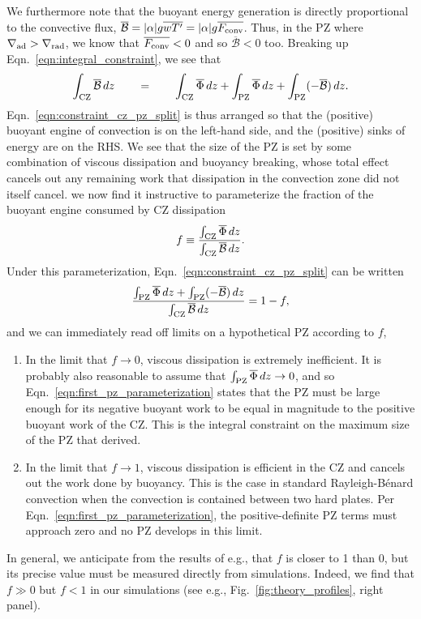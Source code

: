 \documentclass{aastex631}
\newcommand{\gradrad}{\ensuremath{\nabla_{\rm{rad}}}}
\newcommand{\gradad}{\ensuremath{\nabla_{\rm{ad}}}}
\newcommand{\Fconv}{\ensuremath{F_{\rm{conv}}}}
\renewcommand{\bar}[1]{\overline{#1}}
\begin{document}
We furthermore note that the buoyant energy generation is directly proportional to the convective flux, $\bar{\mathcal{B}} = |\alpha|g\bar{w T'} = |\alpha| g \bar{\Fconv}$.
Thus, in the PZ where $\gradad > \gradrad$, we know that $\bar{\Fconv} < 0$ and so $\bar{\mathcal{B}} < 0$ too.
Breaking up Eqn.~\ref{eqn:integral_constraint}, we see that
\begin{equation}
\int_{\rm{CZ}} \bar{\mathcal{B}}\,dz \qquad=\qquad
\int_{\rm{CZ}} \bar{\Phi}\,dz + \int_{\rm{PZ}} \bar{\Phi}\,dz + \int_{\rm{PZ}}(-\bar{\mathcal{B}})\,dz.
\label{eqn:constraint_cz_pz_split}
\end{equation}
Eqn.~\ref{eqn:constraint_cz_pz_split} is thus arranged so that the (positive) buoyant engine of convection is on the left-hand side, and the (positive) sinks of energy are on the RHS.
We see that the size of the PZ is set by some combination of viscous dissipation and buoyancy breaking, whose total effect cancels out any remaining work that dissipation in the convection zone did not itself cancel.
we now find it instructive to parameterize the fraction of the buoyant engine consumed by CZ dissipation  
\begin{equation}
f \equiv \frac{\int_{\rm{CZ}} \bar{\Phi}\,dz}{\int_{\rm{CZ}}\bar{\mathcal{B}}\,dz}.
\label{eqn:f_defn}
\end{equation}
Under this parameterization, Eqn.~\ref{eqn:constraint_cz_pz_split} can be written
\begin{equation}
\frac{\int_{\rm{PZ}} \bar{\Phi}\,dz + \int_{\rm{PZ}}(-\bar{\mathcal{B}})\,dz}{\int_{\rm{CZ}} \bar{\mathcal{B}}\,dz}
= 1 - f,
\label{eqn:first_pz_parameterization}
\end{equation}
and we can immediately read off limits on a hypothetical PZ according to $f$,
\begin{enumerate}
\item In the limit that $f \rightarrow 0$, viscous dissipation is extremely inefficient.
It is probably also reasonable to assume that $\int_{\rm{PZ}}\bar{\Phi}\,dz \rightarrow 0$, and so Eqn.~\ref{eqn:first_pz_parameterization} states that the PZ must be large enough for its negative buoyant work to be equal in magnitude to the positive buoyant work of the CZ.
This is the integral constraint on the maximum size of the PZ that \citet{roxburgh1989} derived.
\item In the limit that $f \rightarrow 1$, viscous dissipation is efficient in the CZ and cancels out the work done by buoyancy.
This is the case in standard Rayleigh-B\'{e}nard convection when the convection is contained between two hard plates.
Per Eqn.~\ref{eqn:first_pz_parameterization}, the positive-definite PZ terms must approach zero and no PZ develops in this limit.
\end{enumerate}
In general, we anticipate from the results of e.g., \citet{currie_browning_2017} that $f$ is closer to 1 than 0, but its precise value must be measured directly from simulations.
Indeed, we find that $f \gg 0$ but $f < 1$ in our simulations (see e.g., Fig.~\ref{fig:theory_profiles}, right panel).
\end{document}
